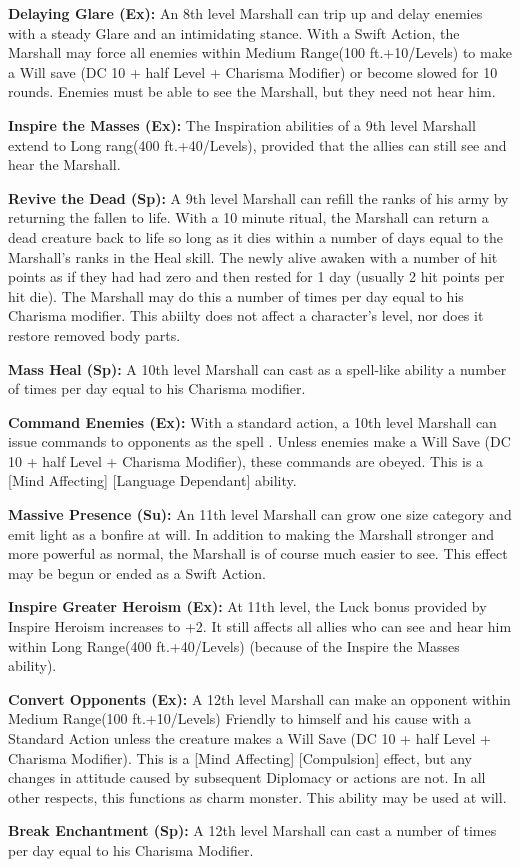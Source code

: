 \textbf{Delaying Glare (Ex):} An 8th level Marshall can trip up and delay enemies with a steady Glare and an intimidating stance. With a Swift Action, the Marshall may force all enemies within Medium Range(100 ft.+10/Levels) to make a Will save (DC 10 + half Level + Charisma Modifier) or become slowed for 10 rounds. Enemies must be able to see the Marshall, but they need not hear him.

\textbf{Inspire the Masses (Ex):} The Inspiration abilities of a 9th level Marshall extend to Long rang(400 ft.+40/Levels), provided that the allies can still see and hear the Marshall.

\textbf{Revive the Dead (Sp):} A 9th level Marshall can refill the ranks of his army by returning the fallen to life. With a 10 minute ritual, the Marshall can return a dead creature back to life so long as it dies within a number of days equal to the Marshall's ranks in the Heal skill. The newly alive awaken with a number of hit points as if they had had zero and then rested for 1 day (usually 2 hit points per hit die). The Marshall may do this a number of times per day equal to his Charisma modifier. This abiilty does not affect a character's level, nor does it restore removed body parts.

\textbf{Mass Heal (Sp):} A 10th level Marshall can cast  as a spell-like ability a number of times per day equal to his Charisma modifier.

\textbf{Command Enemies (Ex):} With a standard action, a 10th level Marshall can issue commands to opponents as the spell . Unless enemies make a Will Save (DC 10 + half Level + Charisma Modifier), these commands are obeyed. This is a [Mind Affecting] [Language Dependant] ability.

\textbf{Massive Presence (Su):} An 11th level Marshall can grow one size category and emit light as a bonfire at will. In addition to making the Marshall stronger and more powerful as normal, the Marshall is of course much easier to see. This effect may be begun or ended as a Swift Action.

\textbf{Inspire Greater Heroism (Ex):} At 11th level, the Luck bonus provided by Inspire Heroism increases to +2. It still affects all allies who can see and hear him within Long Range(400 ft.+40/Levels) (because of the Inspire the Masses ability).

\textbf{Convert Opponents (Ex):} A 12th level Marshall can make an opponent within Medium Range(100 ft.+10/Levels) Friendly to himself and his cause with a Standard Action unless the creature makes a Will Save (DC 10 + half Level + Charisma Modifier). This is a [Mind Affecting] [Compulsion] effect, but any changes in attitude caused by subsequent Diplomacy or actions are not. In all other respects, this functions as charm monster. This ability may be used at will.

\textbf{Break Enchantment (Sp):} A 12th level Marshall can cast  a number of times per day equal to his Charisma Modifier.
